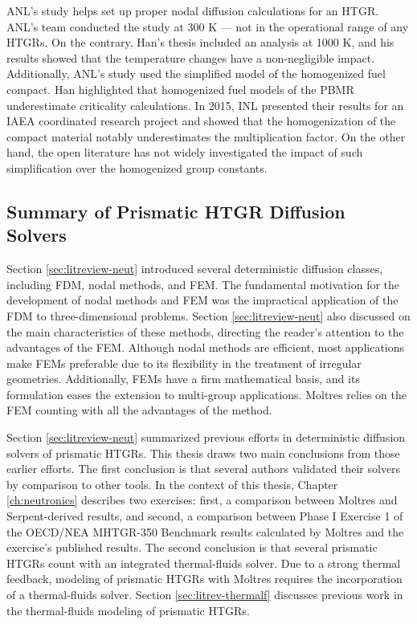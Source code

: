 ANL's study helps set up proper nodal diffusion calculations for an \gls{HTGR}.
ANL's team conducted the study at 300 K --- not in the operational range of any \glspl{HTGR}.
On the contrary, Han's thesis included an analysis at 1000 K, and his results showed that the temperature changes have a non-negligible impact.
Additionally, ANL's study used the simplified model of the homogenized fuel compact.
Han highlighted that homogenized fuel models of the \gls{PBMR} underestimate criticality calculations.
In 2015, \gls{INL} presented their results \cite{strydom_results_2015} for an \gls{IAEA} coordinated research project \cite{tyobeka_htgr_2011} and showed that the homogenization of the compact material notably underestimates the multiplication factor.
On the other hand, the open literature has not widely investigated the impact of such simplification over the homogenized group constants.

\subsection{Summary of Prismatic HTGR Diffusion Solvers}

Section \ref{sec:litreview-neut} introduced several deterministic diffusion classes, including FDM, nodal methods, and FEM.
The fundamental motivation for the development of nodal methods and FEM was the impractical application of the \gls{FDM} to three-dimensional problems.
Section \ref{sec:litreview-neut} also discussed on the main characteristics of these methods, directing the reader's attention to the advantages of the FEM.
Although nodal methods are efficient, most applications make FEMs preferable due to its flexibility in the treatment of irregular geometries.
Additionally, FEMs have a firm mathematical basis, and its formulation eases the extension to multi-group applications.
Moltres relies on the FEM counting with all the advantages of the method.

Section \ref{sec:litreview-neut} summarized previous efforts in deterministic diffusion solvers of prismatic HTGRs.
This thesis draws two main conclusions from those earlier efforts.
The first conclusion is that several authors validated their solvers by comparison to other tools.
In the context of this thesis, Chapter \ref{ch:neutronics} describes two exercises: first, a comparison between Moltres and Serpent-derived results, and second, a comparison between Phase I Exercise 1 of the OECD/NEA MHTGR-350 Benchmark results calculated by Moltres and the exercise's published results.
The second conclusion is that several prismatic HTGRs count with an integrated thermal-fluids solver.
Due to a strong thermal feedback, modeling of prismatic HTGRs with Moltres requires the incorporation of a thermal-fluids solver.
Section \ref{sec:litrev-thermalf} discusses previous work in the thermal-fluids modeling of prismatic HTGRs.


